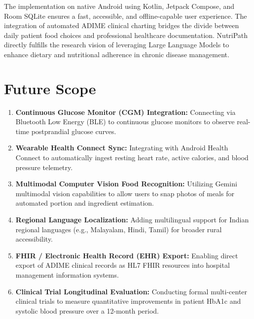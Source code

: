 \documentclass[a4paper,12pt]{report}
\begin{document}
The implementation on native Android using Kotlin, Jetpack Compose, and Room SQLite ensures a fast, accessible, and offline-capable user experience. The integration of automated ADIME clinical charting bridges the divide between daily patient food choices and professional healthcare documentation. NutriPath directly fulfills the research vision of leveraging Large Language Models to enhance dietary and nutritional adherence in chronic disease management.

\section{Future Scope}

\begin{enumerate}

\item \textbf{Continuous Glucose Monitor (CGM) Integration:}
Connecting via Bluetooth Low Energy (BLE) to continuous glucose monitors to observe real-time postprandial glucose curves.

\item \textbf{Wearable Health Connect Sync:}
Integrating with Android Health Connect to automatically ingest resting heart rate, active calories, and blood pressure telemetry.

\item \textbf{Multimodal Computer Vision Food Recognition:}
Utilizing Gemini multimodal vision capabilities to allow users to snap photos of meals for automated portion and ingredient estimation.

\item \textbf{Regional Language Localization:}
Adding multilingual support for Indian regional languages (e.g., Malayalam, Hindi, Tamil) for broader rural accessibility.

\item \textbf{FHIR / Electronic Health Record (EHR) Export:}
Enabling direct export of ADIME clinical records as HL7 FHIR resources into hospital management information systems.

\item \textbf{Clinical Trial Longitudinal Evaluation:}
Conducting formal multi-center clinical trials to measure quantitative improvements in patient HbA1c and systolic blood pressure over a 12-month period.

\end{enumerate}

\vspace{2cm}
\end{document}
